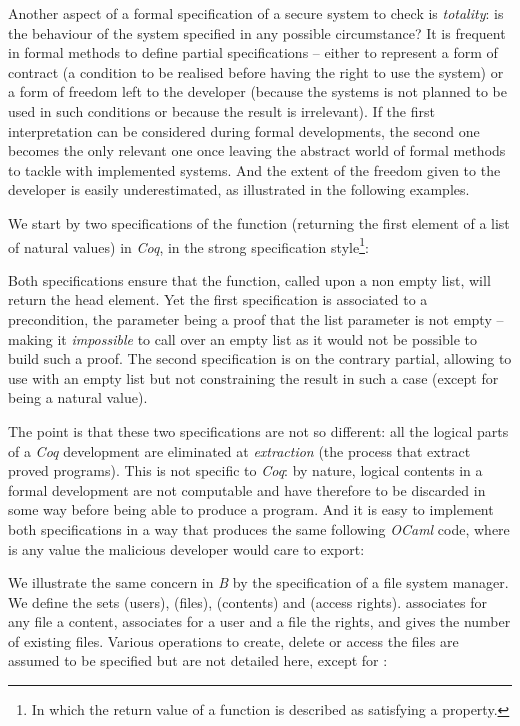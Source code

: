 \documentclass[conference]{IEEEtran}
\begin{document}
Another aspect of a formal specification of a secure system to check is \emph{totality}: is
the behaviour of the system specified in any possible circumstance? It is frequent in formal
methods to define partial specifications -- either to represent a form of contract (a
condition to be realised before having the right to use the system) or a form of freedom left
to the developer (because the systems is not planned to be used in such conditions or because
the result is irrelevant). If the first interpretation can be considered during formal
developments, the second one becomes the only relevant one once leaving the abstract world of
formal methods to tackle with implemented systems. And the extent of the freedom given to the
developer is easily underestimated, as illustrated in the following examples.

We start by two specifications of the {\small} function (returning the first
element of a list of natural values) in \emph{Coq}, in the strong specification
style\footnote{In which the return value of a function is described as satisfying a property.}:

Both specifications ensure that the function, called upon a non empty list, will return the
head element. Yet the first specification is associated to a precondition, the parameter
{\small} being a proof that the list parameter {\small} is  not empty -- making it
\emph{impossible} to call {\small} over an empty list as it would not be
possible to build such a proof. The second specification is on the contrary partial, allowing
to use {\small} with an empty list but not constraining the result in such a
case (except for being a natural value).

The point is that these two specifications are not so different: all the logical parts of a
\emph{Coq} development are eliminated at \emph{extraction} (the process that extract proved
programs). This is not specific to \emph{Coq}: by nature, logical contents in a formal
development are not computable and have therefore to be discarded in some way before being
able to produce a program. And it is easy to implement both specifications in a way that
produces the same following \emph{OCaml} code, where {\small} is any value the
malicious developer would care to export:


We illustrate the same concern in \emph{B} by the specification of a file system manager. We
define the sets {\small} (users), {\small}
(files), {\small} (contents) and {\small} (access rights).
{\small} associates for any file a content, {\small} associates for a
user and a file the rights, and {\small} gives the number of existing files.
Various operations to create, delete or access the files are assumed to be specified but are
not detailed here, except for {\small}:
\end{document}
